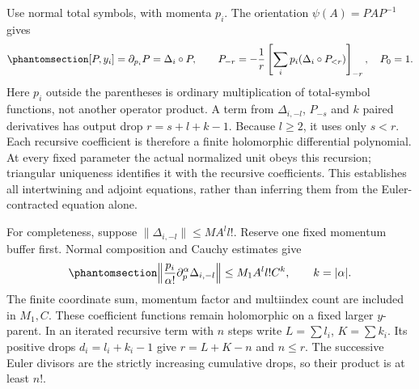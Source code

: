 \documentclass[
  english,
  11pt,
  reqno]{amsart}
\begin{document}
Use normal total symbols, with momenta \(p_i\). The orientation
\(\psi(A)=PAP^{-1}\) gives
\begin{equation}\protect\phantomsection\label{eq:gg-op-relative-inner-euler}{
 [P,y_i]=\partial_{p_i}P=\Delta_i\circ P,\qquad
 P_{-r}=-\frac1r
  \left[\sum_i p_i(\Delta_i\circ P_{<r})\right]_{-r},
 \quad P_0=1.
}\end{equation} Here \(p_i\) outside the parentheses is ordinary
multiplication of total-symbol functions, not another operator product.
A term from \(\Delta_{i,-l}\), \(P_{-s}\) and \(k\) paired derivatives
has output drop \(r=s+l+k-1\). Because \(l\ge2\), it uses only \(s<r\).
Each recursive coefficient is therefore a finite holomorphic
differential polynomial. At every fixed parameter the actual normalized
unit obeys this recursion; triangular uniqueness identifies it with the
recursive coefficients. This establishes all intertwining and adjoint
equations, rather than inferring them from the Euler-contracted equation
alone.

For completeness, suppose \(\|\Delta_{i,-l}\|\le MA^l l!\). Reserve one
fixed momentum buffer first. Normal composition and Cauchy estimates
give
\begin{equation}\protect\phantomsection\label{eq:gg-op-relative-inner-coefficient-bound}{
 \left\|\frac{p_i}{\alpha!}
           \partial_p^\alpha\Delta_{i,-l}\right\|
 \le M_1 A^l l! C^k,\qquad k=|\alpha|.
}\end{equation} The finite coordinate sum, momentum factor and
multiindex count are included in \(M_1,C\). These coefficient functions
remain holomorphic on a fixed larger \(y\)-parent. In an iterated
recursive term with \(n\) steps write \(L=\sum l_i\), \(K=\sum k_i\).
Its positive drops \(d_i=l_i+k_i-1\) give \(r=L+K-n\) and \(n\le r\).
The successive Euler divisors are the strictly increasing cumulative
drops, so their product is at least \(n!\).
\end{document}
